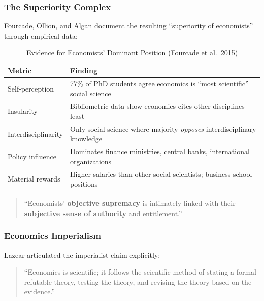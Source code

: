 \subsubsection{The Superiority Complex}

Fourcade, Ollion, and Algan \citep{fourcade2015superiority} document the resulting
``superiority of economists'' through empirical data:

\begin{table}[htbp]
\centering
\caption{Evidence for Economists' Dominant Position (Fourcade et al.\ 2015)}
\label{tab:superiority-evidence}
\renewcommand{\arraystretch}{1.3}
\small
\begin{tabular}{@{}lp{8cm}@{}}
\toprule
\textbf{Metric} & \textbf{Finding} \\
\midrule
Self-perception & 77\% of PhD students agree economics is ``most scientific'' social science \\
Insularity & Bibliometric data show economics cites other disciplines least \\
Interdisciplinarity & Only social science where majority \textit{opposes} interdisciplinary knowledge \\
Policy influence & Dominates finance ministries, central banks, international organizations \\
Material rewards & Higher salaries than other social scientists; business school positions \\
\bottomrule
\end{tabular}
\end{table}

\begin{quote}
``Economists' \textbf{objective supremacy} is intimately linked with their
\textbf{subjective sense of authority} and entitlement.'' \citep{fourcade2015superiority}
\end{quote}

\subsubsection{Economics Imperialism}

Lazear \citep{lazear2000} articulated the imperialist claim explicitly:

\begin{quote}
``Economics is scientific; it follows the scientific method of stating a formal
refutable theory, testing the theory, and revising the theory based on the evidence.''
\end{quote}

